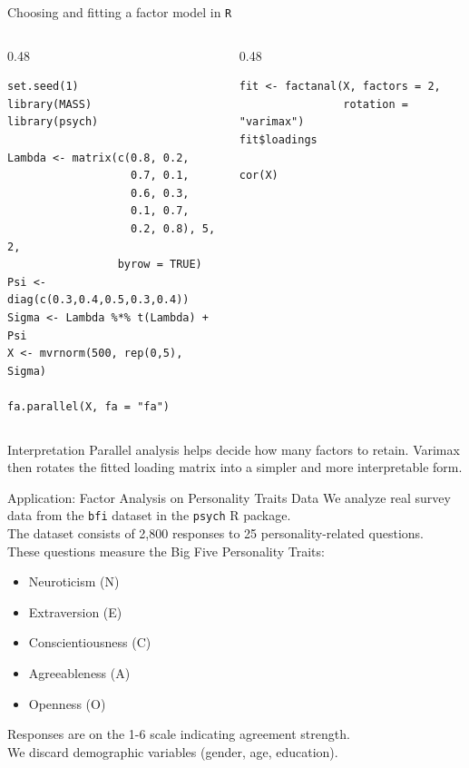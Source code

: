 \documentclass[dvipsnames,aspectratio=169,handout]{beamer}
\begin{document}
\begin{frame}[fragile]{Choosing and fitting a factor model in \texttt{R}}
\begin{columns}[T,onlytextwidth]
\begin{column}{0.48\textwidth}
\begin{lstlisting}
set.seed(1)
library(MASS)
library(psych)

Lambda <- matrix(c(0.8, 0.2,
                   0.7, 0.1,
                   0.6, 0.3,
                   0.1, 0.7,
                   0.2, 0.8), 5, 2,
                 byrow = TRUE)
Psi <- diag(c(0.3,0.4,0.5,0.3,0.4))
Sigma <- Lambda %*% t(Lambda) + Psi
X <- mvrnorm(500, rep(0,5), Sigma)

fa.parallel(X, fa = "fa")
\end{lstlisting}
\end{column}
\begin{column}{0.48\textwidth}
\begin{lstlisting}
fit <- factanal(X, factors = 2,
                rotation = "varimax")
fit$loadings

cor(X)
\end{lstlisting}
\end{column}
\end{columns}

\begin{alertblock}{Interpretation}
Parallel analysis helps decide how many factors to retain.
Varimax then rotates the fitted loading matrix into a simpler and more interpretable form.
\end{alertblock}
\end{frame}


\begin{frame}{Application: Factor Analysis on Personality Traits Data}
We analyze real survey data from the \texttt{bfi} dataset in the \texttt{psych} R package.\\[4mm]
The dataset consists of 2,800 responses to 25 personality-related questions.\\[4mm]
These questions measure the Big Five Personality Traits:
    \begin{itemize}
      \item Neuroticism (N)
      \item Extraversion (E)
      \item Conscientiousness (C)
      \item Agreeableness (A)
      \item Openness (O)
    \end{itemize}
Responses are on the 1-6 scale indicating agreement strength.\\[4mm]

We discard demographic variables (gender, age, education).
\end{frame}
\end{document}
